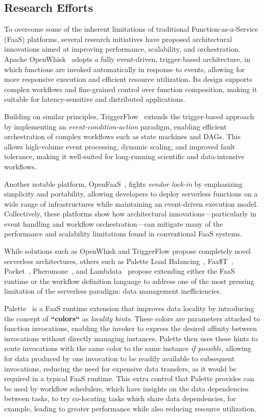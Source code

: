 \subsection{Research Efforts}

To overcome some of the inherent limitations of traditional Function-as-a-Service (FaaS) platforms, several research initiatives have proposed architectural innovations aimed at improving performance, scalability, and orchestration. Apache OpenWhisk~\cite{open_whisk} adopts a fully event-driven, trigger-based architecture, in which functions are invoked automatically in response to events, allowing for more responsive execution and efficient resource utilization. Its design supports complex workflows and fine-grained control over function composition, making it suitable for latency-sensitive and distributed applications. 

Building on similar principles, TriggerFlow~\cite{triggerflow} extends the trigger-based approach by implementing an \textit{event-condition-action} paradigm, enabling efficient orchestration of complex workflows such as state machines and DAGs. This allows high-volume event processing, dynamic scaling, and improved fault tolerance, making it well-suited for long-running scientific and data-intensive workflows. 

Another notable platform, OpenFaaS~\cite{openfaas}, fights \textit{vendor lock-in} by emphasizing simplicity and portability, allowing developers to deploy serverless functions on a wide range of infrastructures while maintaining an event-driven execution model. Collectively, these platforms show how architectural innovations—particularly in event handling and workflow orchestration—can mitigate many of the performance and scalability limitations found in conventional FaaS systems.

While solutions such as OpenWhisk and TriggerFlow propose completely novel serverless architectures, others such as Palette Load Balancing~\cite{palette_load_balancing}, Faa\$T~\cite{faast_caching}, Pocket~\cite{pocket}, Pheromone~\cite{pheromone}, and Lambdata~\cite{lambdata_intents} propose extending either the FaaS runtime or the workflow definition language to address one of the most pressing limitation of the serverless paradigm: data management inefficiencies.

Palette~\cite{palette_load_balancing} is a FaaS runtime extension that improves data locality by introducing the concept of \textbf{``colors``} as \textit{locality hints}. These colors are parameters attached to function invocations, enabling the invoker to express the desired affinity between invocations without directly managing instances. Palette then uses these hints to route invocations with the same color to the same instance \textit{if possible}, allowing for data produced by one invocation to be readily available to subsequent invocations, reducing the need for expensive data transfers, as it would be required in a typical FaaS runtime. This extra control that Palette provides can be used by workflow schedulers, which have insights on the data dependencies between tasks, to try co-locating tasks which share data dependencies, for example, leading to greater performance while also reducing resource utilization.

